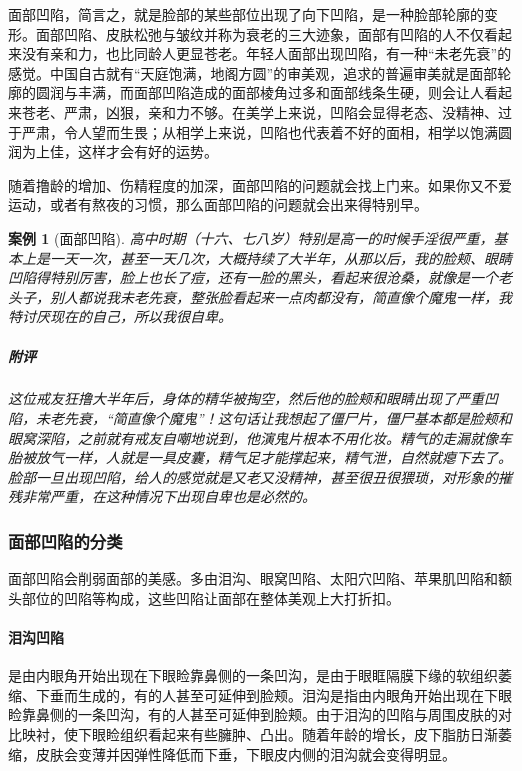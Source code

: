 \documentclass{ctexart}
\newtheorem{case}{案例}
\begin{document}
面部凹陷，简言之，就是脸部的某些部位出现了向下凹陷，是一种脸部轮廓的变形。面部凹陷、皮肤松弛与皱纹并称为衰老的三大迹象，面部有凹陷的人不仅看起来没有亲和力，也比同龄人更显苍老。年轻人面部出现凹陷，有一种“未老先衰”的感觉。中国自古就有“天庭饱满，地阁方圆”的审美观，追求的普遍审美就是面部轮廓的圆润与丰满，而面部凹陷造成的面部棱角过多和面部线条生硬，则会让人看起来苍老、严肃，凶狠，亲和力不够。在美学上来说，凹陷会显得老态、没精神、过于严肃，令人望而生畏；从相学上来说，凹陷也代表着不好的面相，相学以饱满圆润为上佳，这样才会有好的运势。

随着撸龄的增加、伤精程度的加深，面部凹陷的问题就会找上门来。如果你又不爱运动，或者有熬夜的习惯，那么面部凹陷的问题就会出来得特别早。

\begin{case}[面部凹陷]
    高中时期（十六、七八岁）特别是高一的时候手淫很严重，基本上是一天一次，甚至一天几次，大概持续了大半年，从那以后，我的脸颊、眼睛凹陷得特别厉害，脸上也长了痘，还有一脸的黑头，看起来很沧桑，就像是一个老头子，别人都说我未老先衰，整张脸看起来一点肉都没有，简直像个魔鬼一样，我特讨厌现在的自己，所以我很自卑。
    \subparagraph{附评} 这位戒友狂撸大半年后，身体的精华被掏空，然后他的脸颊和眼睛出现了严重凹陷，未老先衰，“简直像个魔鬼”！这句话让我想起了僵尸片，僵尸基本都是脸颊和眼窝深陷，之前就有戒友自嘲地说到，他演鬼片根本不用化妆。精气的走漏就像车胎被放气一样，人就是一具皮囊，精气足才能撑起来，精气泄，自然就瘪下去了。脸部一旦出现凹陷，给人的感觉就是又老又没精神，甚至很丑很猥琐，对形象的摧残非常严重，在这种情况下出现自卑也是必然的。
\end{case}

\subsubsection{面部凹陷的分类}

面部凹陷会削弱面部的美感。多由泪沟、眼窝凹陷、太阳穴凹陷、苹果肌凹陷和额头部位的凹陷等构成，这些凹陷让面部在整体美观上大打折扣。

\paragraph{泪沟凹陷} 是由内眼角开始出现在下眼睑靠鼻侧的一条凹沟，是由于眼眶隔膜下缘的软组织萎缩、下垂而生成的，有的人甚至可延伸到脸颊。泪沟是指由内眼角开始出现在下眼睑靠鼻侧的一条凹沟，有的人甚至可延伸到脸颊。由于泪沟的凹陷与周围皮肤的对比映衬，使下眼睑组织看起来有些臃肿、凸出。随着年龄的增长，皮下脂肪日渐萎缩，皮肤会变薄并因弹性降低而下垂，下眼皮内侧的泪沟就会变得明显。
\end{document}
